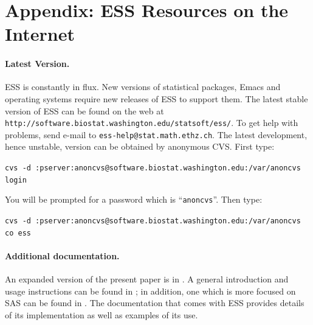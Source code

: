\documentclass{article}
\def\url#1{\stexttt{#1}} %
\newcommand{\stexttt}[1]{{\small\texttt{#1}}}
\begin{document}



\clearpage

\appendix 
\section{Appendix: ESS Resources on the Internet}
\label{sec:access}

\paragraph{Latest Version.}

ESS is constantly in flux.  New versions of statistical
packages, Emacs and operating systems require new releases of ESS to
support them.  The latest stable version of ESS can be found on the web at
\url{http://software.biostat.washington.edu/statsoft/ess/}.  To get help
with problems, send e-mail to \url{ess-help@stat.math.ethz.ch}.
The latest development, hence unstable, version can be obtained by
anonymous CVS.  First type:

\stexttt{cvs -d
  :pserver:anoncvs@software.biostat.washington.edu:/var/anoncvs login}
  
You will be prompted for a password which is ``\stexttt{anoncvs}''.
Then type:

\stexttt{cvs -d
  :pserver:anoncvs@software.biostat.washington.edu:/var/anoncvs co
  ess}

\paragraph{Additional documentation.} 

An expanded version of the present paper is in \citep{RMHHS:2001}.  A
general introduction and usage instructions can be found in
\citep{heiberger:dsc:2001}; in addition, one which is more focused on
SAS can be found in \citep{heiberger:philasugi:2001}.  The
documentation that comes with ESS provides details of its
implementation as well as examples of its use.
\end{document}
